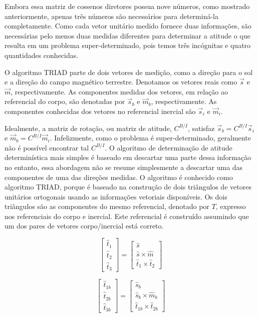 Embora essa matriz de cossenos diretores possua nove números, como mostrado anteriormente, apenas três números são necessários para determiná-la completamente. Como cada vetor unitário medido fornece duas informações, são necessárias pelo menos duas medidas diferentes para determinar a atitude o que resulta em um problema super-determinado, pois temos três incógnitas e quatro quantidades conhecidas.

O algoritmo TRIAD parte de dois vetores de medição, como a direção para o sol e a direção do campo magnético terrestre. Denotamos os vetores reais como $\vec{s}$ e $\vec{m}$, respectivamente. As componentes medidas dos vetores, em relação ao referencial do corpo, são denotadas por $\vec{s}_b$ e $\vec{m}_b$, respectivamente. As componentes conhecidas dos vetores no referencial inercial são $\vec{s}_i$ e $\vec{m}_i$.

Idealmente, a matriz de rotação, ou matriz de atitude, $C^{B/I}$, satisfaz $\vec{s}_b=C^{B/I}\vec{s}_i$ e $\vec{m}_b=C^{B/I}\vec{m}_i$. Infelizmente, como o problema é super-determinado, geralmente não é possível encontrar tal $C^{B/I}$. O algoritmo de determinação de atitude determinística mais simples é baseado em descartar uma parte dessa informação no entanto, essa abordagem não se resume simplesmente a descartar uma das componentes de uma das direções medidas. O algoritmo é conhecido como algoritmo TRIAD, porque é baseado na construção de dois triângulos de vetores unitários ortogonais usando as informações vetoriais disponíveis. Os dois triângulos são as componentes do mesmo referencial, denotado por $T$, expresso nos referenciais do corpo e inercial. Este referencial é construído assumindo que um dos pares de vetores corpo/inercial está correto.


\begin{equation}
\begin{bmatrix} \hat{t}_1 \\ \hat{t}_2 \\ \hat{t}_3
\end{bmatrix} = \begin{bmatrix} \hat{s} \\  \hat{s}\times\hat{m} 
\\ \hat{t}_1\times\hat{t}_2
\end{bmatrix}
\end{equation}

\begin{equation}
\begin{bmatrix} \hat{t}_{1b} \\ \hat{t}_{2b} \\ \hat{t}_{3b}
\end{bmatrix} = \begin{bmatrix} \hat{s}_b \\  \hat{s}_b\times\hat{m}_b 
\\ \hat{t}_{1b}\times\hat{t}_{2b}
\end{bmatrix}
\end{equation}

